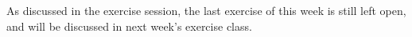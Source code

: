 \documentclass[a4paper]{article}
\begin{document}



\dlz



As discussed in the exercise session, the last exercise of this week is still left open, and will be discussed in next week's exercise class.


% 


% 
\end{document}
